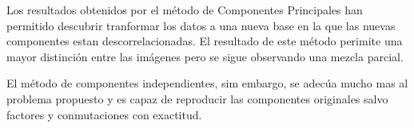\documentclass{article}
\begin{document}
Los resultados obtenidos por el método de Componentes Principales han
permitido descubrir tranformar los datos a una nueva base en la que las
nuevas componentes estan descorrelacionadas. El resultado de este método
perimite una mayor distinción entre las imágenes pero se sigue
observando una mezcla parcial.

El método de componentes independientes, sim embargo, se adecúa mucho
mas al problema propuesto y es capaz de reproducir las componentes
originales salvo factores y conmutaciones con exactitud.


    
    



    
    
\end{document}
